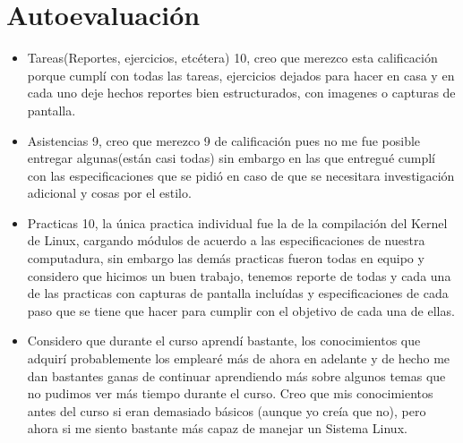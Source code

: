\documentclass[a4paper, 11pt, oneside]{article}
\begin{document}
\section*{Autoevaluación}
\begin{itemize}
    \item Tareas(Reportes, ejercicios, etcétera) 10, creo que merezco esta calificación porque cumplí con todas las tareas, ejercicios dejados para hacer en casa y en cada uno deje hechos reportes bien estructurados, con imagenes o capturas de pantalla.
    \item Asistencias 9, creo que merezco 9 de calificación pues no me fue posible entregar algunas(están casi todas) sin embargo en las que entregué cumplí con las especificaciones que se pidió en caso de que se necesitara investigación adicional y cosas por el estilo.
    \item Practicas 10, la única practica individual fue la de la compilación del Kernel de Linux, cargando módulos de acuerdo a las especificaciones de nuestra computadura, sin embargo las demás practicas fueron todas en equipo y considero que hicimos un buen trabajo, tenemos reporte de todas y cada una de las practicas con capturas de pantalla incluídas y especificaciones de cada paso que se tiene que hacer para cumplir con el objetivo de cada una de ellas.
    \item Considero que durante el curso aprendí bastante, los conocimientos que adquirí probablemente los emplearé más de ahora en adelante y de hecho me dan bastantes ganas de continuar aprendiendo más sobre algunos temas que no pudimos ver más tiempo durante el curso. Creo que mis conocimientos antes del curso si eran demasiado básicos (aunque yo creía que no), pero ahora si me siento bastante más capaz de manejar un Sistema Linux.
    
\end{itemize}
\end{document}
